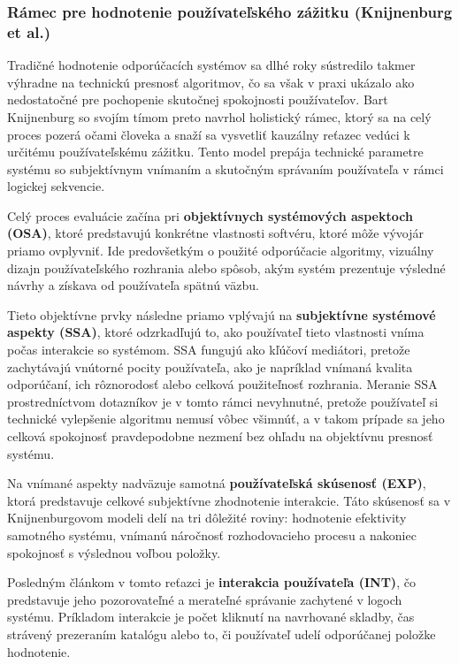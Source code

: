 \subsubsection{Rámec pre hodnotenie používateľského zážitku (Knijnenburg et al.)}
Tradičné hodnotenie odporúčacích systémov sa dlhé roky sústredilo takmer výhradne na technickú presnosť algoritmov, čo sa však v praxi ukázalo ako nedostatočné pre pochopenie skutočnej spokojnosti používateľov. Bart Knijnenburg so svojím tímom preto navrhol holistický rámec, ktorý sa na celý proces pozerá očami človeka a snaží sa vysvetliť kauzálny reťazec vedúci k určitému používateľskému zážitku. \cite{Knij, 108vChallenges} Tento model prepája technické parametre systému so subjektívnym vnímaním a skutočným správaním používateľa v rámci logickej sekvencie. \cite{Knij}

Celý proces evaluácie začína pri \textbf{objektívnych systémových aspektoch (OSA)}, ktoré predstavujú konkrétne vlastnosti softvéru, ktoré môže vývojár priamo ovplyvniť. Ide predovšetkým o použité odporúčacie algoritmy, vizuálny dizajn používateľského rozhrania alebo spôsob, akým systém prezentuje výsledné návrhy a získava od používateľa spätnú väzbu. \cite{Knij, challenges}

Tieto objektívne prvky následne priamo vplývajú na \textbf{subjektívne systémové aspekty (SSA)}, ktoré odzrkadľujú to, ako používateľ tieto vlastnosti vníma počas interakcie so systémom. SSA fungujú ako kľúčoví mediátori, pretože zachytávajú vnútorné pocity používateľa, ako je napríklad vnímaná kvalita odporúčaní, ich rôznorodosť alebo celková použiteľnosť rozhrania. \cite{Knij, Ricci, challenges} Meranie SSA prostredníctvom dotazníkov je v tomto rámci nevyhnutné, pretože používateľ si technické vylepšenie algoritmu nemusí vôbec všimnúť, a v takom prípade sa jeho celková spokojnosť pravdepodobne nezmení bez ohľadu na objektívnu presnosť systému. \cite{Ricci}

Na vnímané aspekty nadväzuje samotná \textbf{používateľská skúsenosť (EXP)}, ktorá predstavuje celkové subjektívne zhodnotenie interakcie. Táto skúsenosť sa v Knijnenburgovom modeli delí na tri dôležité roviny: hodnotenie efektivity samotného systému, vnímanú náročnosť rozhodovacieho procesu a nakoniec spokojnosť s výslednou voľbou položky. \cite{Knij, Ricci, challenges}

Posledným článkom v tomto reťazci je \textbf{interakcia používateľa (INT)}, čo predstavuje jeho pozorovateľné a merateľné správanie zachytené v logoch systému. Príkladom interakcie je počet kliknutí na navrhované skladby, čas strávený prezeraním katalógu alebo to, či používateľ udelí odporúčanej položke hodnotenie. \cite{Knij, Ricci, challenges}

